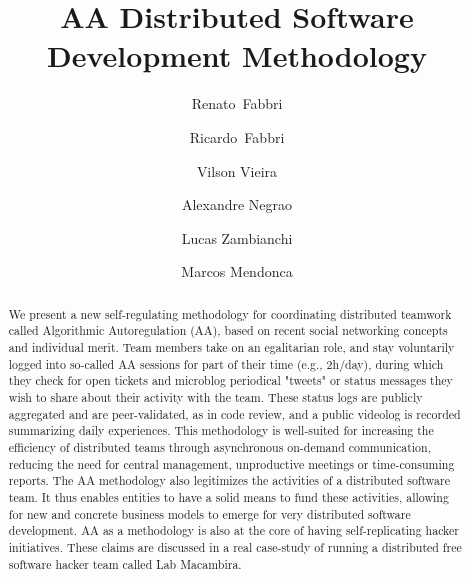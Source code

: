 \title{%
AA Distributed Software Development Methodology
}

\author{%
Renato~Fabbri \and Ricardo~Fabbri \and Vilson Vieira \and Alexandre Negrao \and Lucas Zambianchi
\and Marcos Mendonca
}

\maketitle


\begin{abstract}
We present a new self-regulating methodology for coordinating
distributed teamwork called Algorithmic Autoregulation (AA),  based on recent social
networking concepts and individual merit. Team members take on an egalitarian role, and stay
voluntarily logged into so-called AA sessions for part of their time (e.g.,
2h/day), during which they check for open tickets and microblog periodical
"tweets" or status messages they wish to share about their activity with the
team. These status logs are publicly aggregated and are peer-validated,
as in code review, and a public videolog is recorded summarizing daily experiences.
This methodology is well-suited for increasing the efficiency of distributed
teams through asynchronous on-demand communication, reducing the need for
central management, unproductive meetings or time-consuming reports.  The AA
methodology also legitimizes the activities of a distributed software team.  It
thus enables entities to have a solid means to fund these activities, allowing
for new and concrete business models to emerge for very distributed software
development. AA as a methodology is also at the core of having self-replicating
hacker initiatives. These claims are discussed in a real case-study of running a distributed
free software hacker team called Lab Macambira.
\end{abstract}

